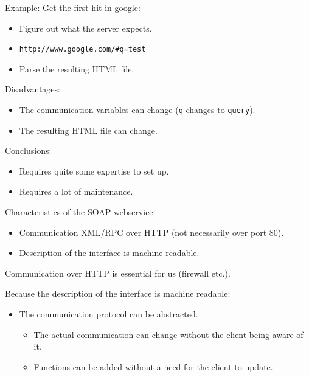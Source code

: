 \documentclass[a4, portrait]{seminar}
\begin{document}
\begin{slide}
Example: Get the first hit in google:
\begin{itemize}
\item Figure out what the server expects.
\item {\tt http://www.google.com/\#q=test}
\item Parse the resulting HTML file.
\end{itemize}

Disadvantages:
\begin{itemize}
\item The communication variables can change ({\tt q} changes to {\tt query}).
\item The resulting HTML file can change.
\end{itemize}

Conclusions:
\begin{itemize}
\item Requires quite some expertise to set up.
\item Requires a lot of maintenance.
\end{itemize}
\vfill
\end{slide}

\begin{slide}
Characteristics of the SOAP webservice:

\begin{itemize}
\item Communication XML/RPC over HTTP (not necessarily over port 80).
\item Description of the interface is machine readable.
\end{itemize}

Communication over HTTP is essential for us (firewall etc.).

\vspace{.5cm}
Because the description of the interface is machine readable: 
\begin{itemize}
\item The communication protocol can be abstracted.
\begin{itemize}
\item The actual communication can change without the client being aware of it.
\item Functions can be added without a need for the client to update.
\end{itemize}
\end{itemize}

\vfill
\end{slide}
\end{document}
